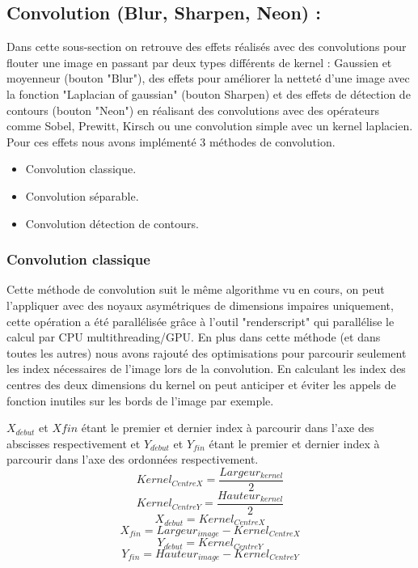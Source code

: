 \subsection{Convolution (Blur, Sharpen, Neon) :} \label{convolution}

    Dans cette sous-section on retrouve des effets réalisés avec des convolutions pour flouter une image en passant par deux types différents de kernel : Gaussien et moyenneur
    (bouton "Blur"), des effets pour améliorer la netteté d'une image avec la fonction "Laplacian of gaussian" (bouton Sharpen) et des effets de 
    détection de contours (bouton "Neon") en réalisant des convolutions avec des opérateurs comme Sobel, Prewitt, Kirsch ou une convolution simple avec un kernel
    laplacien.
    \\

    Pour ces effets nous avons implémenté 3 méthodes de convolution.


    \begin{itemize}
        \item Convolution classique.
        \item Convolution séparable.
        \item Convolution détection de contours.
    \end{itemize}
    

    \subsubsection*{Convolution classique} \label{conv_classique}
    
        Cette méthode de convolution suit le même algorithme vu en cours, on peut l'appliquer avec des noyaux asymétriques de dimensions impaires uniquement,
        cette opération a été parallélisée grâce à l'outil "renderscript" qui parallélise le calcul par CPU multithreading/GPU. En plus dans cette méthode (et dans toutes les autres) nous avons rajouté
        des optimisations pour parcourir seulement les index nécessaires de l'image lors de la convolution. En calculant les index des centres des deux dimensions du kernel
        on peut anticiper et éviter les appels de fonction inutiles sur les bords de l'image par exemple.
        
        $X_{d\acute{e}but}$ et $X{fin}$ étant le premier et dernier index à parcourir dans l'axe des abscisses respectivement et
        $Y_{d\acute{e}but}$ et $Y_{fin}$ étant le premier et dernier index à parcourir dans l'axe des ordonnées respectivement.
        \[
            Kernel_{CentreX} =   \frac{Largeur_{kernel}}{2}            
        \]
        \[
            Kernel_{CentreY} =   \frac{Hauteur_{kernel}}{2}            
        \]
        \[
            X_{d\acute{e}but} = Kernel_{CentreX}      
        \]
        \[
            X_{fin} = Largeur_{image} - Kernel_{CentreX}           
        \]
        \[
            Y_{d\acute{e}but} = Kernel_{CentreY}      
        \]
        \[
            Y_{fin} = Hauteur_{image} - Kernel_{CentreY}           
        \]

